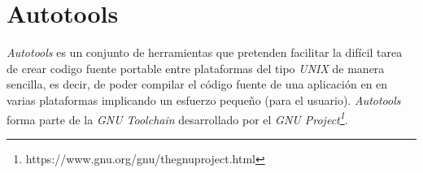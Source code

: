 
\chapter{Autotools}
\label{appendix:autotools}
 
\textit{Autotools} es un conjunto de herramientas que pretenden facilitar la difícil tarea de crear codigo fuente portable entre plataformas del tipo \textit{UNIX} de manera sencilla, es decir, de poder compilar el código fuente de una aplicación en en varias plataformas implicando un esfuerzo pequeño (para el usuario). \textit{Autotools} forma parte de la \textit{GNU Toolchain} desarrollado por el \textit{GNU Project\footnote{https://www.gnu.org/gnu/thegnuproject.html}}.
